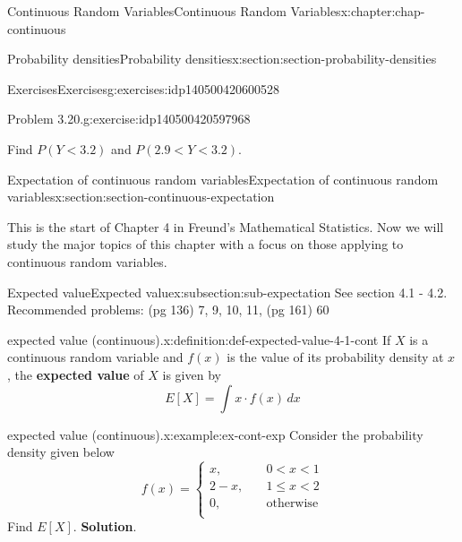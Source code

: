 \documentclass[oneside,10pt,]{book}
\newcommand{\blocktitlefont}{\relax}
\newcommand{\terminology}[1]{\textbf{#1}}
\newcommand{\lt}{<}
\newcommand{\amp}{&}
\begin{document}
\begin{chapterptx}{Continuous Random Variables}{}{Continuous Random Variables}{}{}{x:chapter:chap-continuous}
\begin{sectionptx}{Probability densities}{}{Probability densities}{}{}{x:section:section-probability-densities}
\begin{exercises-subsection}{Exercises}{}{Exercises}{}{}{g:exercises:idp140500420600528}
\begin{divisionexercise}{1}{Problem 3.20.}{}{g:exercise:idp140500420597968}
\begin{equation*}
\end{equation*}
%
\par
Find \(P(Y \lt 3.2)\) and \(P(2.9 \lt Y \lt 3.2)\).%
\end{divisionexercise}%
\end{exercises-subsection}
\end{sectionptx}
%
%
\typeout{************************************************}
\typeout{************************************************}
%
\begin{sectionptx}{Expectation of continuous random variables}{}{Expectation of continuous random variables}{}{}{x:section:section-continuous-expectation}
\begin{introduction}{}%
This is the start of Chapter 4 in Freund's Mathematical Statistics. Now we will study the major topics of this chapter with a focus on those applying to continuous random variables.%
\end{introduction}%
%
%
\typeout{************************************************}
\typeout{************************************************}
%
\begin{subsectionptx}{Expected value}{}{Expected value}{}{}{x:subsection:sub-expectation}
See section 4.1 - 4.2. Recommended problems: (pg 136) 7, 9, 10, 11, (pg 161) 60%
\begin{definition}{expected value (continuous).}{x:definition:def-expected-value-4-1-cont}%
If \(X\) is a continuous random variable and \(f(x)\) is the value of its probability density at \(x\), the \terminology{expected value} of \(X\) is given by%
\begin{equation*}
E[X] = \int x\cdot f(x)\,dx
\end{equation*}
%
\end{definition}
\begin{example}{expected value (continuous).}{x:example:ex-cont-exp}%
Consider the probability density given below%
\begin{equation*}
f(x) = \begin{cases}x,
\amp \quad 0 \lt x \lt 1\\
2-x, \amp \quad 1 \le x \lt 2\\
0, \amp \quad \text{otherwise}\\
\end{cases}
\end{equation*}
Find \(E[X]\).%
\textbf{\blocktitlefont Solution}.\quad{}%
\begin{equation*}

\end{equation*}
\end{example}
\end{subsectionptx}
\end{sectionptx}
\end{chapterptx}
\end{document}
